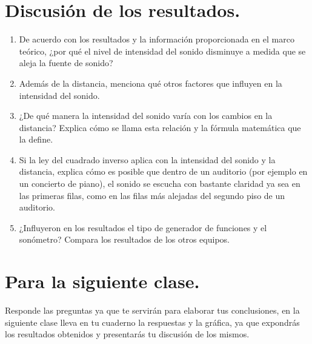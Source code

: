 \documentclass[14pt]{extarticle}
\begin{document}
\section{Discusión de los resultados.}

\begin{enumerate}
\item De acuerdo con los resultados y la información proporcionada en el marco teórico, ¿por qué el nivel de intensidad del sonido disminuye a medida que se aleja la fuente de sonido?
\item Además de la distancia, menciona qué otros factores que influyen en la intensidad del sonido.
\item ¿De qué manera la intensidad del sonido varía con los cambios en la distancia? Explica cómo se llama esta relación y la fórmula matemática que la define.
\item Si la ley del cuadrado inverso aplica con la intensidad del sonido y la distancia, explica cómo es posible que dentro de un auditorio (por ejemplo en un concierto de piano), el sonido se escucha con bastante claridad ya sea en las primeras filas, como en las filas más alejadas del segundo piso de un auditorio.
\item ¿Influyeron en los resultados el tipo de generador de funciones y el sonómetro? Compara los resultados de los otros equipos.
\end{enumerate}

\section{Para la siguiente clase.}

Responde las preguntas ya que te servirán para elaborar tus conclusiones, en la siguiente clase lleva en tu cuaderno la respuestas y la gráfica, ya que expondrás los resultados obtenidos y presentarás tu discusión de los mismos.
\end{document}
